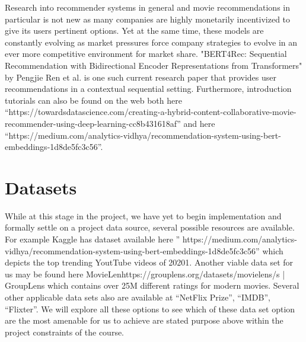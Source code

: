 \documentclass[10pt,twocolumn,letterpaper]{article}
\begin{document}
Research into recommender systems in general and movie recommendations in particular is not new as many companies are highly monetarily incentivized to give its users pertinent options.  Yet at the same time, these models are constantly evolving as market pressures force company strategies to evolve in an ever more competitive environment for market share. "BERT4Rec: Sequential Recommendation with Bidirectional Encoder Representations from Transformers" by Pengjie Ren et al. is one such current research paper that provides user recommendations in a contextual sequential setting.  Furthermore, introduction tutorials can also be found on the web both here “https://towardsdatascience.com/creating-a-hybrid-content-collaborative-movie-recommender-using-deep-learning-cc8b431618af” and here “https://medium.com/analytics-vidhya/recommendation-system-using-bert-embeddings-1d8de5fc3c56”.


\section{Datasets}

While at this stage in the project, we have yet to begin implementation and formally settle on a project data source, several possible resources are available.  For example Kaggle has dataset available here ” https://medium.com/analytics-vidhya/recommendation-system-using-bert-embeddings-1d8de5fc3c56” which depicts the top trending YoutTube videos of 20201.  Another viable data set for us may be found here MovieLenhttps://grouplens.org/datasets/movielens/s | GroupLens which contains over 25M different ratings for modern movies.  Several other applicable data sets also are available at “NetFlix Prize”, “IMDB”, “Flixter”.  We will explore all these options to see which of these data set option are the most amenable for us to achieve are stated purpose above within the project constraints of the course.
\end{document}
